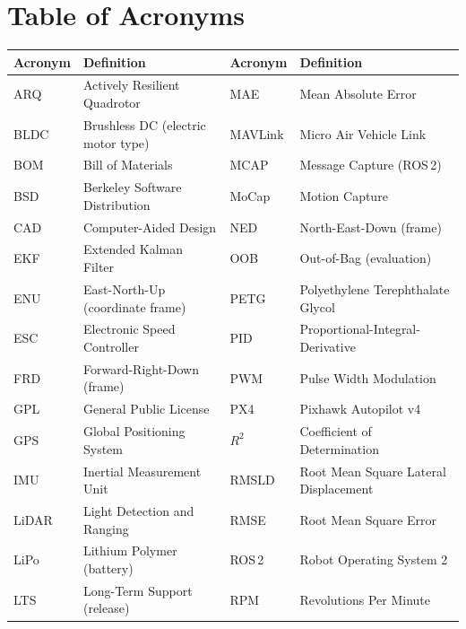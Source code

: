 \section*{Table of Acronyms}

\footnotesize
\setlength{\tabcolsep}{4pt}
\begin{tabular}{p{}p{}p{}p{}}
\toprule
\textbf{Acronym} & \textbf{Definition} &
\textbf{Acronym} & \textbf{Definition} \\
\midrule
ARQ & Actively Resilient Quadrotor &
MAE & Mean Absolute Error \\
BLDC & Brushless DC (electric motor type) &
MAVLink & Micro Air Vehicle Link \\
BOM & Bill of Materials &
MCAP & Message Capture (ROS\,2) \\
BSD & Berkeley Software Distribution &
MoCap & Motion Capture \\
CAD & Computer-Aided Design &
NED & North-East-Down (frame) \\
EKF & Extended Kalman Filter &
OOB & Out-of-Bag (evaluation) \\
ENU & East-North-Up (coordinate frame) &
PETG & Polyethylene Terephthalate Glycol \\
ESC & Electronic Speed Controller &
PID & Proportional-Integral-Derivative \\
FRD & Forward-Right-Down (frame) &
PWM & Pulse Width Modulation \\
GPL & General Public License &
PX4 & Pixhawk Autopilot v4 \\
GPS & Global Positioning System &
$R^2$ & Coefficient of Determination \\
IMU & Inertial Measurement Unit &
RMSLD & Root Mean Square Lateral Displacement \\
LiDAR & Light Detection and Ranging &
RMSE & Root Mean Square Error \\
LiPo & Lithium Polymer (battery) &
ROS\,2 & Robot Operating System 2 \\
LTS & Long-Term Support (release) &
RPM & Revolutions Per Minute \\
\bottomrule
\end{tabular}
\vspace{1em}

